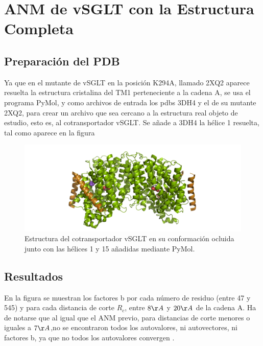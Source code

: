 \section{ANM de vSGLT con la Estructura Completa}
\subsection{Preparaci\'{o}n del PDB}
Ya que en el mutante de vSGLT en la posici\'{o}n K294A, llamado 2XQ2 aparece resuelta la estructura cristalina del TM1 perteneciente a la cadena A, se usa el programa PyMol, y como archivos de entrada los pdbs 3DH4 y el de su mutante 2XQ2, para crear un archivo que sea cercano a la estructura real objeto de estudio, esto es, al cotransportador vSGLT. Se a\~{n}ade a 3DH4 la h\'{e}lice 1 resuelta, tal como aparece en la figura 
\begin{figure}[h]
 \centering
 \includegraphics[scale=0.3]{Kap4/vSGLT_n.png}
 \caption{Estructura del cotransportador vSGLT en su conformaci\'{o}n ocluida junto con las h\'{e}lices 1 y 15 a\~{n}adidas mediante PyMol.}
 \label{fig:vSGLT_in_2}
\end{figure}

\subsection{Resultados}
En la figura \label{fig:ANM_pos}
se muestran los factores b por cada n\'{u}mero de residuo (entre 47 y 545) y para cada distancia de corte $R_c$, entre $8\AA$ y $20\AA$ de la cadena A. Ha de notarse que al igual que el ANM previo, para distancias de corte menores o iguales a $7\AA$,no se encontraron todos  los autovalores, ni autovectores, ni factores b, ya que no todos los autovalores convergen \cite{Zimmermann2011}.\\


